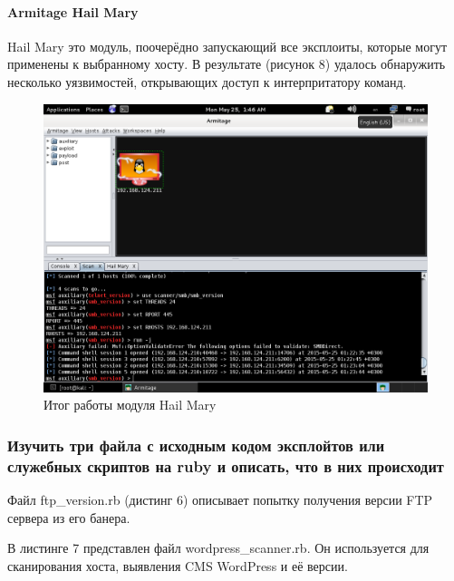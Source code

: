 \paragraph{Armitage Hail Mary}

Hail Mary это модуль, поочерёдно запускающий все эксплоиты, которые могут применены к выбранному хосту. В результате (рисунок 8) удалось обнаружить несколько уязвимостей, открывающих доступ к интерпритатору команд.

\begin{figure}[h!]
\centering
\includegraphics[scale=0.50]{res/pic08}
\caption{Итог работы модуля Hail Mary}
\end{figure}

\newpage
\subsubsection{Изучить три файла с исходным кодом эксплойтов или служебных скриптов на ruby и описать, что в них происходит}

Файл ftp\_version.rb (дистинг 6) описывает попытку получения версии FTP сервера из его банера.



В листинге 7 представлен файл wordpress\_scanner.rb. Он используется для сканирования хоста, выявления CMS WordPress и её версии.



